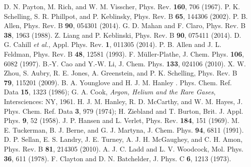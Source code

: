 \documentclass[aps,prb,twocolumn,showpacs,superscriptaddress]{revtex4-1}\begin{tiny}\end{tiny}
\begin{document}
{\begin{thebibliography}{99}
 D. N. Payton, M. Rich, and W. M. Visscher, Phys. Rev. {\bf 160}, 706 (1967).
 P. K. Schelling, S. R. Phillpot, and P. Keblinsky, Phys. Rev. B {\bf 65}, 144306 (2002).
 P. B. Allen, Phys. Rev. B {\bf 90}, 054301 (2014).
 G. D. Mahan and F. Claro, Phys. Rev. B {\bf 38}, 1963 (1988).
 Z. Liang and P. Keblinski, Phys. Rev. B {\bf 90}, 075411 (2014).
 D. G. Cahill {\it et al.}, Appl. Phys. Rev. {\bf 1}, 011305 (2014).
 P. B. Allen and J. L. Feldman, Phys. Rev. B {\bf 48}, 12581 (1993).
 F. M\"uller-Plathe, J. Chem. Phys. {\bf 106}, 6082 (1997).
 B.-Y. Cao and Y.-W. Li, J. Chem. Phys. {\bf 133}, 024106 (2010).
 X. W. Zhou, S. Aubry, R. E. Jones, A. Greenstein, and P. K. Schelling,
Phys. Rev. B {\bf 79}, 115201 (2009).
  B. A. Younglove and H. J. M. Hanley . Phys. Chem. Ref. Data {\bf 15}, 1323 (1986); 
G. A. Cook, {\it Argon, Helium and the Rare Gases}, Intersciences: NY, 1961.
 H. J. M. Hanley, R. D. McCarthy, and W. M. Hayes, J. Phys. Chem. Ref. Data
{\bf 3}, 979 (1974); H. Ziebland and T. Burton, Brit. J. Appl. Phys. {\bf 9}, 52 (1958).
 J. P. Hansen and L. Verlet, Phys. Rev. {\bf 184}, 151 (1969).
 M. E. Tuckerman, B. J. Berne, and G. J. Martyna, J. Chem. Phys. {\bf 94}, 6811 (1991).
 D. P. Sellan, E. S. Landry, J. E. Turney, A. J. H. McGaughey, and C. H. Amon,
Phys. Rev. B {\bf 81}, 214305 (2010).
 A. J. C. Ladd and L. V. Woodcock, Mol. Phys. {\bf 36}, 611 (1978).
 F. Clayton and D. N. Batchelder, J. Phys. C {\bf 6}, 1213 (1973).

\end{thebibliography}}
\end{document}

